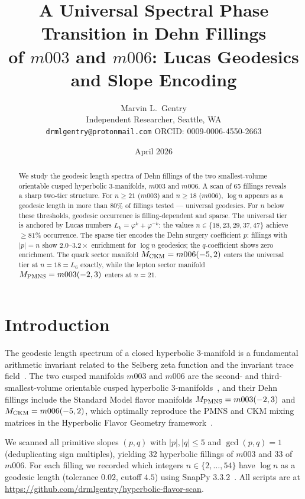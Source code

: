 \documentclass[12pt]{article}
\title{A Universal Spectral Phase Transition in Dehn Fillings\\
of $m003$ and $m006$: Lucas Geodesics and Slope Encoding}
\author{Marvin L.\ Gentry\\
\small Independent Researcher, Seattle, WA\\
\small \texttt{drmlgentry@protonmail.com}\quad
ORCID: 0009-0006-4550-2663}
\date{April 2026}
\theoremstyle{definition}
\newcommand{\ph}{\varphi}
\begin{document}
\maketitle

\begin{abstract}
We study the geodesic length spectra of Dehn fillings of the two
smallest-volume orientable cusped hyperbolic 3-manifolds, $m003$ and
$m006$. A scan of 65 fillings reveals a sharp two-tier structure.
For $n \ge 21$ ($m003$) and $n \ge 18$ ($m006$), $\log n$
appears as a geodesic length in more than $80\%$ of fillings tested
--- universal geodesics. For $n$ below these thresholds, geodesic
occurrence is filling-dependent and sparse. The universal tier is
anchored by Lucas numbers $L_k = \ph^k + \ph^{-k}$: the values
$n \in \{18, 23, 29, 37, 47\}$ achieve $\ge 81\%$ occurrence.
The sparse tier encodes the Dehn surgery coefficient $p$: fillings
with $|p| = n$ show $2.0$--$3.2\times$ enrichment for $\log n$
geodesics; the $q$-coefficient shows zero enrichment. The quark
sector manifold $M_{\rm CKM} = m006(-5,2)$ enters the universal
tier at $n = 18 = L_6$ exactly, while the lepton sector manifold
$M_{\rm PMNS} = m003(-2,3)$ enters at $n = 21$.
\end{abstract}

\section{Introduction}

The geodesic length spectrum of a closed hyperbolic 3-manifold is a
fundamental arithmetic invariant related to the Selberg zeta function
and the invariant trace field~\cite{MaclachlanReid}. The two cusped
manifolds $m003$ and $m006$ are the second- and third-smallest-volume
orientable cusped hyperbolic 3-manifolds~\cite{GMM}, and their Dehn
fillings include the Standard Model flavor manifolds
$M_{\rm PMNS} = m003(-2,3)$ and $M_{\rm CKM} = m006(-5,2)$, which
optimally reproduce the PMNS and CKM mixing matrices in the Hyperbolic
Flavor Geometry framework~\cite{Gentry:CKM,Gentry:PMNS}.

We scanned all primitive slopes $(p,q)$ with $|p|,|q|\le 5$ and
$\gcd(p,q)=1$ (deduplicating sign multiples), yielding 32 hyperbolic
fillings of $m003$ and 33 of $m006$. For each filling we recorded which
integers $n \in \{2,\ldots,54\}$ have $\log n$ as a geodesic length
(tolerance $0.02$, cutoff $4.5$) using SnapPy 3.3.2~\cite{SnapPy}.
All scripts are at \url{https://github.com/drmlgentry/hyperbolic-flavor-scan}.
\end{document}
